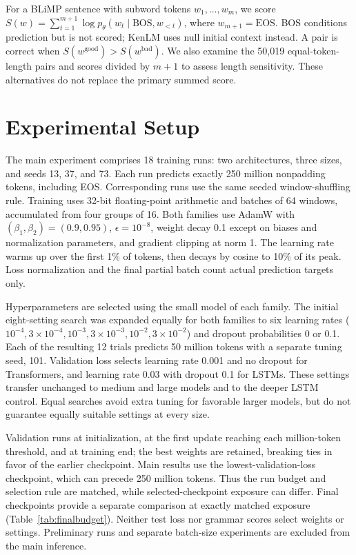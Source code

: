 \documentclass[10pt]{article}
\begin{document}
For a BLiMP sentence with subword tokens $w_1,\ldots,w_m$, we score $S(w)=\sum_{t=1}^{m+1}\log p_\theta(w_t\mid\mathrm{BOS},w_{<t})$, where $w_{m+1}=\mathrm{EOS}$. BOS conditions prediction but is not scored; KenLM uses null initial context instead. A pair is correct when $S(w^{\mathrm{good}})>S(w^{\mathrm{bad}})$. We also examine the 50,019 equal-token-length pairs and scores divided by $m+1$ to assess length sensitivity. These alternatives do not replace the primary summed score.

\section{Experimental Setup}

The main experiment comprises 18 training runs: two architectures, three sizes, and seeds 13, 37, and 73. Each run predicts exactly 250 million nonpadding tokens, including EOS. Corresponding runs use the same seeded window-shuffling rule. Training uses 32-bit floating-point arithmetic and batches of 64 windows, accumulated from four groups of 16. Both families use AdamW with $(\beta_1,\beta_2)=(0.9,0.95)$, $\epsilon=10^{-8}$, weight decay 0.1 except on biases and normalization parameters, and gradient clipping at norm 1. The learning rate warms up over the first 1\% of tokens, then decays by cosine to 10\% of its peak. Loss normalization and the final partial batch count actual prediction targets only.

Hyperparameters are selected using the small model of each family. The initial eight-setting search was expanded equally for both families to six learning rates ($10^{-4},3\!\times\!10^{-4},10^{-3},3\!\times\!10^{-3},10^{-2},3\!\times\!10^{-2}$) and dropout probabilities 0 or 0.1. Each of the resulting 12 trials predicts 50 million tokens with a separate tuning seed, 101. Validation loss selects learning rate 0.001 and no dropout for Transformers, and learning rate 0.03 with dropout 0.1 for LSTMs. These settings transfer unchanged to medium and large models and to the deeper LSTM control. Equal searches avoid extra tuning for favorable larger models, but do not guarantee equally suitable settings at every size.

Validation runs at initialization, at the first update reaching each million-token threshold, and at training end; the best weights are retained, breaking ties in favor of the earlier checkpoint. Main results use the lowest-validation-loss checkpoint, which can precede 250 million tokens. Thus the run budget and selection rule are matched, while selected-checkpoint exposure can differ. Final checkpoints provide a separate comparison at exactly matched exposure (Table~\ref{tab:finalbudget}). Neither test loss nor grammar scores select weights or settings. Preliminary runs and separate batch-size experiments are excluded from the main inference.
\end{document}
